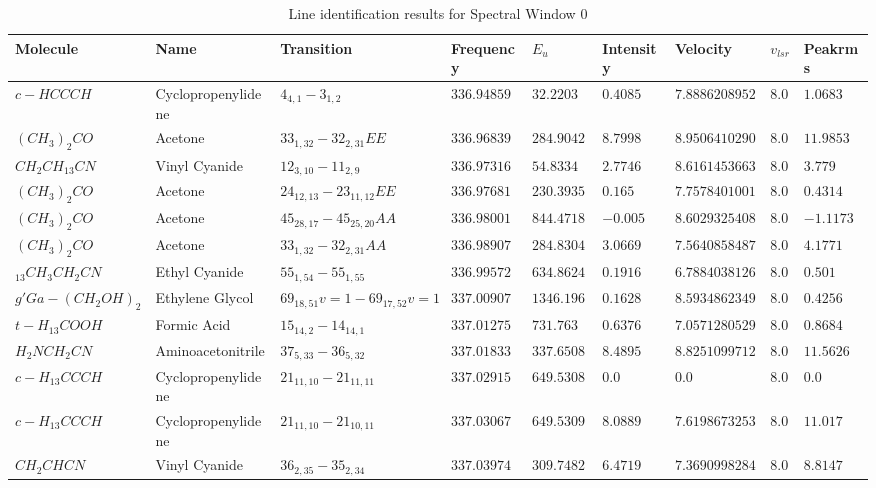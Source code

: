 \documentclass{aa}
\begin{document}
 \begin{table}   
 \label{table:1}  
     \caption{Line identification results for Spectral Window 0}
 \tiny
    \centering    
    \begin{tabular}{l l l l l l l l l} 
    \hline\hline       
    Molecule & Name &Transition & Frequency & $E_{u}$ & Intensity & Velocity & $v_{lsr}$ & Peakrms\\ 
    \hline    
$c-HCCCH$ & Cyclopropenylidene & $4_{4,1}-3_{1,2}$ & $336.94859$ & $32.2203$ & $0.4085$ & $7.88862089526$ & $8.0$ & $1.0683$\\
$(CH_{3})_{2}CO$ & Acetone & $33_{1,32}-32_{2,31}EE$ & $336.96839$ & $284.9042$ & $8.7998$ & $8.95064102901$ & $8.0$ & $11.9853$\\
$CH_{2}CH_{13}CN$ & Vinyl Cyanide & $12_{3,10}-11_{2,9}$ & $336.97316$ & $54.8334$ & $2.7746$ & $8.61614536631$ & $8.0$ & $3.779$\\
$(CH_{3})_{2}CO$ & Acetone & $24_{12,13}-23_{11,12}EE$ & $336.97681$ & $230.3935$ & $0.165$ & $7.75784010018$ & $8.0$ & $0.4314$\\
$(CH_{3})_{2}CO$ & Acetone & $45_{28,17}-45_{25,20}AA$ & $336.98001$ & $844.4718$ & $-0.005$ & $8.6029325408$ & $8.0$ & $-1.1173$\\
$(CH_{3})_{2}CO$ & Acetone & $33_{1,32}-32_{2,31}AA$ & $336.98907$ & $284.8304$ & $3.0669$ & $7.56408584877$ & $8.0$ & $4.1771$\\
$_{13}CH_{3}CH_{2}CN$ & Ethyl Cyanide & $55_{1,54}-55_{1,55}$ & $336.99572$ & $634.8624$ & $0.1916$ & $6.78840381265$ & $8.0$ & $0.501$\\
$g'Ga-(CH_{2}OH)_{2}$ & Ethylene Glycol & $69_{18,51}v=1-69_{17,52}v=1$ & $337.00907$ & $1346.1964$ & $0.1628$ & $8.5934862349$ & $8.0$ & $0.4256$\\
$t-H_{13}COOH$ & Formic Acid & $15_{14,2}-14_{14,1}$ & $337.01275$ & $731.763$ & $0.6376$ & $7.05712805295$ & $8.0$ & $0.8684$\\
$H_{2}NCH_{2}CN$ & Aminoacetonitrile & $37_{5,33}-36_{5,32}$ & $337.01833$ & $337.6508$ & $8.4895$ & $8.82510997129$ & $8.0$ & $11.5626$\\
$c-H_{13}CCCH$ & Cyclopropenylidene & $21_{11,10}-21_{11,11}$ & $337.02915$ & $649.5308$ & $0.0$ & $0.0$ & $8.0$ & $0.0$\\
$c-H_{13}CCCH$ & Cyclopropenylidene & $21_{11,10}-21_{10,11}$ & $337.03067$ & $649.5309$ & $8.0889$ & $7.61986732531$ & $8.0$ & $11.017$\\
$CH_{2}CHCN$ & Vinyl Cyanide & $36_{2,35}-35_{2,34}$ & $337.03974$ & $309.7482$ & $6.4719$ & $7.36909982843$ & $8.0$ & $8.8147$\\

\end{tabular}
\end{table}
\end{document}

